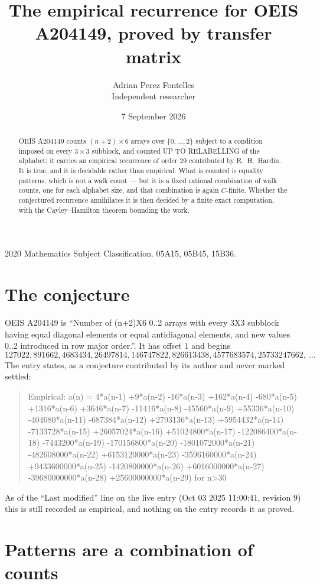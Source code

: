 \documentclass[11pt,a4paper]{article}
\title{The empirical recurrence for OEIS A204149, proved by transfer matrix}
\author{Adrian Perez Fontelles\\ \small Independent researcher}
\date{7 September 2026}
\theoremstyle{plain}
\theoremstyle{definition}
\begin{document}
\maketitle

\begin{abstract}
OEIS A204149 counts $(n+2)\times6$ arrays over $\{0,\dots,2\}$ subject to a condition imposed on
every $3\times3$ subblock, and counted UP TO RELABELLING of the
alphabet; it carries an empirical recurrence of order $29$ contributed by
R.~H.~Hardin. It is true, and it is decidable rather than empirical. What is counted is
equality patterns, which is not a walk count --- but it is a fixed rational combination of
walk counts, one for each alphabet size, and that combination is again $C$-finite. Whether the
conjectured recurrence annihilates it is then decided by a finite exact computation, with the
Cayley--Hamilton theorem bounding the work.
\end{abstract}

\noindent\small 2020 Mathematics Subject Classification. 05A15, 05B45, 15B36.\normalsize

\section{The conjecture}

OEIS A204149 is ``Number of (n+2)X6 0..2 arrays with every 3X3 subblock having equal diagonal elements or equal antidiagonal elements, and new values 0..2 introduced in row major order.''. It has offset $1$ and begins
\[
127022, 891662, 4683434, 26497814, 146747822, 826613438, 4577683574, 25733247662,\ \dots
\]
The entry states, as a conjecture contributed by its author and never marked settled:
\begin{quote}
Empirical: a(n) = 4*a(n-1) +9*a(n-2) -16*a(n-3) +162*a(n-4) -680*a(n-5) +1316*a(n-6) +3646*a(n-7) -11416*a(n-8) -45560*a(n-9) +55336*a(n-10) -404680*a(n-11) -687384*a(n-12) +2793136*a(n-13) +5954432*a(n-14) -7133728*a(n-15) +26057024*a(n-16) +51024800*a(n-17) -122086400*a(n-18) -7443200*a(n-19) -170156800*a(n-20) -1801072000*a(n-21) -482608000*a(n-22) +6153120000*a(n-23) -3596160000*a(n-24) +9433600000*a(n-25) -1420800000*a(n-26) +6016000000*a(n-27) -39680000000*a(n-28) +25600000000*a(n-29) for n>30
\end{quote}
As of the ``Last modified'' line on the live entry (Oct 03 2025 11:00:41, revision 9) this is still
recorded as empirical, and nothing on the entry records it as proved.

\section{Patterns are a combination of counts}
\end{document}
